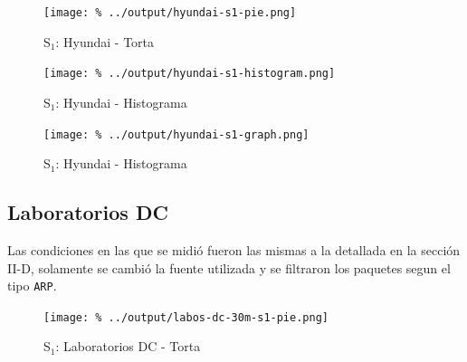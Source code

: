 \documentclass[final,inline,a4paper,narroweqnarray]{ieee}
\begin{document}
    \begin{figure}[ht]\begin{center}
      \texttt{[image: \%
      ../output/hyundai-s1-pie.png]}
      \vspace{-2em}
      \caption{S$_1$: Hyundai - Torta}
      \label{hyundai-s1-pie}
    \end{center}\end{figure}

    \begin{figure}[H]\begin{center}
      \texttt{[image: \%
      ../output/hyundai-s1-histogram.png]}
      \vspace{-2em}
      \caption{S$_1$: Hyundai - Histograma}
      \label{hyundai-s1-histogram}
    \end{center}\end{figure}

    \begin{figure}[ht]\begin{center}
      \texttt{[image: \%
      ../output/hyundai-s1-graph.png]}
      \vspace{-2em}
      \caption{S$_1$: Hyundai - Histograma}
      \label{hyundai-s1-histogram}
    \end{center}\end{figure}

  \subsection{Laboratorios DC}

  Las condiciones en las que se midió fueron las mismas a la detallada en la
  sección II-D, solamente se cambió la fuente utilizada y se filtraron los
  paquetes segun el tipo \texttt{ARP}.  

    \begin{figure}[H]\begin{center}
      \texttt{[image: \%
      ../output/labos-dc-30m-s1-pie.png]}
      \vspace{-2em}
      \caption{S$_1$: Laboratorios DC - Torta}
      \label{labos-dc-30m-s1-pie}
    \end{center}\end{figure}
\end{document}

